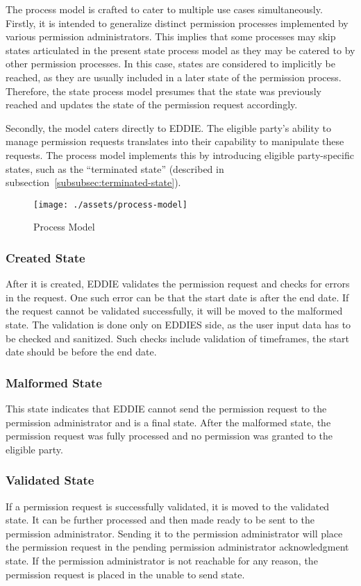 The process model is crafted to cater to multiple use cases simultaneously.
Firstly, it is intended to generalize distinct permission processes implemented by various permission administrators.
This implies that some processes may skip states articulated in the present state process model as they may be catered to by other permission processes.
In this case, states are considered to implicitly be reached, as they are usually included in a later state of the permission process.
Therefore, the state process model presumes that the state was previously reached and updates the state of the permission request accordingly.

Secondly, the model caters directly to EDDIE.
The eligible party's ability to manage permission requests translates into their capability to manipulate these requests.
The process model implements this by introducing eligible party-specific states, such as the ``terminated state'' (described in subsection\ \ref{subsubsec:terminated-state}).

\begin{figure}[h]
    \centering
    \texttt{[image: ./assets/process-model]}
    \caption{Process Model}
    \label{fig:process-model}
\end{figure}

\subsubsection{Created State}
After it is created, EDDIE validates the permission request and checks for errors in the request.
One such error can be that the start date is after the end date.
If the request cannot be validated successfully, it will be moved to the malformed state.
The validation is done only on EDDIES side, as the user input data has to be checked and sanitized.
Such checks include validation of timeframes, the start date should be before the end date.

\subsubsection{Malformed State}
This state indicates that EDDIE cannot send the permission request to the permission administrator and is a final state.
After the malformed state, the permission request was fully processed and no permission was granted to the eligible party.

\subsubsection{Validated State}
If a permission request is successfully validated, it is moved to the validated state.
It can be further processed and then made ready to be sent to the permission administrator.
Sending it to the permission administrator will place the permission request in the pending permission administrator acknowledgment state.
If the permission administrator is not reachable for any reason, the permission request is placed in the unable to send state.

